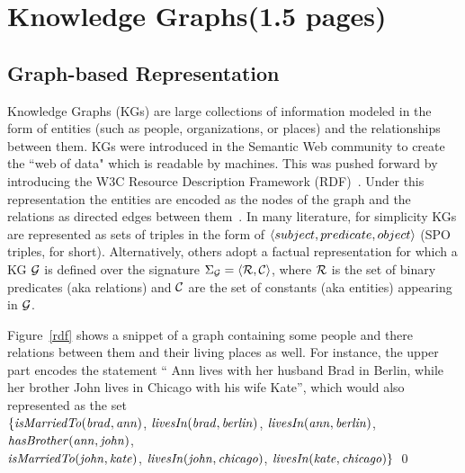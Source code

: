\section{Knowledge Graphs(1.5 pages)}
\label{sec:kgs}

\subsection{Graph-based Representation}
Knowledge Graphs (KGs) are large collections of information modeled in the form of entities (such as people, organizations, or places) and the relationships between them. KGs were introduced in the Semantic Web community to create the ``web of data" which is readable by machines. This was pushed forward by introducing the W3C Resource Description Framework (RDF)~\cite{rdf2004}. Under this representation the entities are encoded as the nodes of the graph and the relations as directed edges between them~\cite{Nickel2015ARO}. In many literature, for simplicity KGs are represented as sets of triples in the form of $\langle subject, predicate,object\rangle$ (SPO triples, for short). Alternatively, %
others adopt a factual representation for which a KG $\mathcal{G}$ is defined over the signature $\Sigma_{\mathcal{G}}=\langle\mathcal{R},\mathcal{C}\rangle$, where $\mathcal{R}$ is the set of binary predicates (aka relations) and $\mathcal{C}$  are the set of constants (aka entities) appearing in $\mathcal{G}$.  %

\begin{example} Figure~\ref{rdf} shows a snippet of a graph containing some people and there relations between them and their living places as well. For instance, the upper part encodes the statement `` Ann lives with her husband Brad in Berlin, while her brother John lives in Chicago with his wife Kate'', which would also represented as the set \\$\{ \mathit{isMarriedTo(brad, ann)}$,  $\mathit{livesIn(brad, berlin)}$, $\mathit{livesIn(ann, berlin)}$,\\ $\mathit{hasBrother(ann, john)}$,\\ $\mathit{isMarriedTo(john, kate)}$, $\mathit{livesIn(john, chicago)}$, $\mathit{livesIn(kate, chicago)} \}$ \qed
\end{example}





